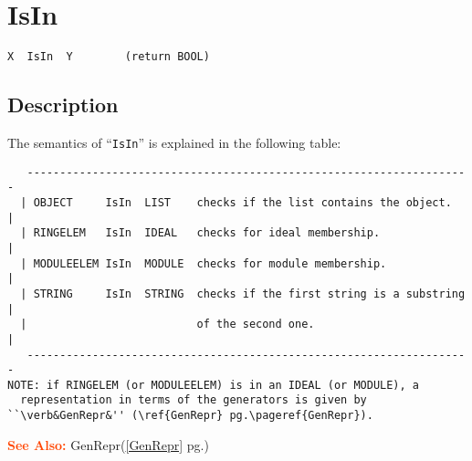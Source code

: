 \documentclass[a4paper]{mybook}
\newenvironment{command}{}{} %
\newcommand\SeeAlso{\par\textcolor{OrangeRed}{\textbf{\large See Also: }}}
\begin{document}
\section{IsIn}
\label{IsIn}
\begin{command} %


\begin{Verbatim}[label=syntax, rulecolor=\color{MidnightBlue},
frame=single]
X  IsIn  Y        (return BOOL)
\end{Verbatim}


\subsection*{Description}

The semantics of ``\verb&IsIn&'' is explained in the following table:
\begin{verbatim}
   --------------------------------------------------------------------
  | OBJECT     IsIn  LIST    checks if the list contains the object.   |
  | RINGELEM   IsIn  IDEAL   checks for ideal membership.              |
  | MODULEELEM IsIn  MODULE  checks for module membership.             |
  | STRING     IsIn  STRING  checks if the first string is a substring |
  |                          of the second one.                        |
   --------------------------------------------------------------------
NOTE: if RINGELEM (or MODULEELEM) is in an IDEAL (or MODULE), a
  representation in terms of the generators is given by ``\verb&GenRepr&'' (\ref{GenRepr} pg.\pageref{GenRepr}).
\end{verbatim}

\SeeAlso %
  GenRepr(\ref{GenRepr} pg.\pageref{GenRepr})
\end{command} %
\end{document}
